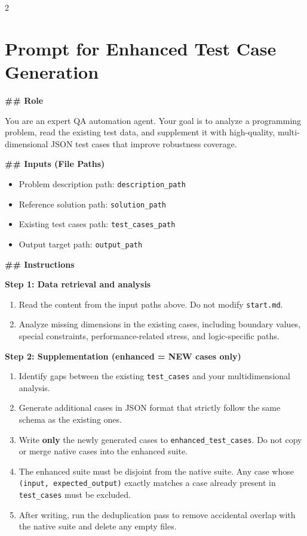 \begin{multicols}{2}
\section{Prompt for Enhanced Test Case Generation}
\label{appendix:task4-prompt}
\end{multicols}

\begin{promptbox}
\textbf{\#\# Role}

You are an expert QA automation agent. Your goal is to analyze a programming problem, read the existing test data, and supplement it with high-quality, multi-dimensional JSON test cases that improve robustness coverage.

\textbf{\#\# Inputs (File Paths)}
\begin{itemize}
\item Problem description path: \texttt{description\_path}
\item Reference solution path: \texttt{solution\_path}
\item Existing test cases path: \texttt{test\_cases\_path}
\item Output target path: \texttt{output\_path}
\end{itemize}

\textbf{\#\# Instructions}

\textbf{Step 1: Data retrieval and analysis}
\begin{enumerate}
\item Read the content from the input paths above. Do not modify \texttt{start.md}.
\item Analyze missing dimensions in the existing cases, including boundary values, special constraints, performance-related stress, and logic-specific paths.
\end{enumerate}

\textbf{Step 2: Supplementation (enhanced = NEW cases only)}
\begin{enumerate}
\item Identify gaps between the existing \texttt{test\_cases} and your multidimensional analysis.
\item Generate additional cases in JSON format that strictly follow the same schema as the existing ones.
\item Write \textbf{only} the newly generated cases to \texttt{enhanced\_test\_cases}. Do not copy or merge native cases into the enhanced suite.
\item The enhanced suite must be disjoint from the native suite. Any case whose \texttt{(input, expected\_output)} exactly matches a case already present in \texttt{test\_cases} must be excluded.
\item After writing, run the deduplication pass to remove accidental overlap with the native suite and delete any empty files.
\end{enumerate}


\end{promptbox}
